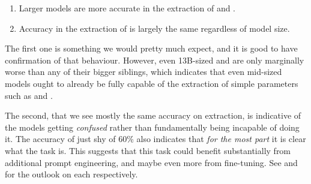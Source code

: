 \begin{enumerate}
    \item Larger models are more accurate in the extraction of \ttemp and \ttime.
    \item Accuracy in the extraction of \tsolv is largely the same regardless of model size.
\end{enumerate}

The first one is something we would pretty much expect, and it is good to have confirmation of that behaviour.
However, even 13B-sized  and  are only marginally worse than any of their bigger siblings, which indicates that even mid-sized models ought to already be fully capable of the extraction of simple parameters such as \ttemp and \ttime.

The second, that we see mostly the same accuracy on \tsolv extraction, is indicative of the models getting \textit{confused} rather than fundamentally being incapable of doing it.
The accuracy of just shy of 60\% also indicates that \textit{for the most part} it is clear what the task is.
This suggests that this task could benefit substantially from additional prompt engineering, and maybe even more from fine-tuning. See  and  for the outlook on each respectively.




